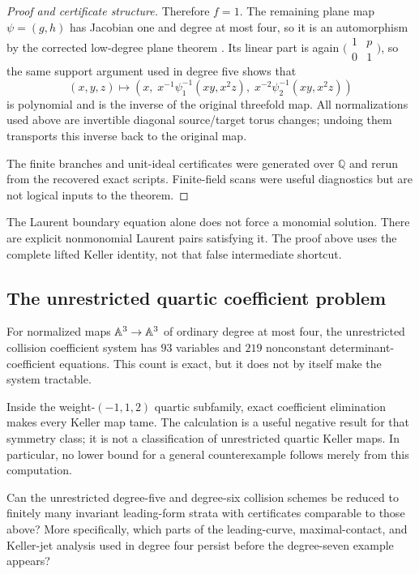 \begin{proof}[Proof and certificate structure]
Therefore \(f=1\).  The remaining plane map \(\psi=(g,h)\) has Jacobian
one and degree at most four, so it is an automorphism by the corrected
low-degree plane theorem \cite{appelgateOnishi1985,nagata1988two}.  Its
linear part is again
\(\bigl(\begin{smallmatrix}1&p\\0&1\end{smallmatrix}\bigr)\), so the same
support argument used in degree five shows that
\[
(x,y,z)\longmapsto
\left(x,\;x^{-1}\psi^{-1}_1(xy,x^2z),\;
x^{-2}\psi^{-1}_2(xy,x^2z)\right)
\]
is polynomial and is the inverse of the original threefold map.  All
normalizations used above are invertible diagonal source/target torus
changes; undoing them transports this inverse back to the original map.

The finite branches and unit-ideal certificates were generated over
\(\mathbb Q\) and rerun from the recovered exact scripts.  Finite-field
scans were useful diagnostics but are not logical inputs to the theorem.
\end{proof}

\begin{remark}
The Laurent boundary equation alone does not force a monomial solution.
There are explicit nonmonomial Laurent pairs satisfying it.  The proof above
uses the complete lifted Keller identity, not that false intermediate
shortcut.
\end{remark}

\subsection{The unrestricted quartic coefficient problem}

For normalized maps \(\mathbb A^3\to\mathbb A^3\) of ordinary degree at most four, the
unrestricted collision coefficient system has \(93\) variables and \(219\)
nonconstant determinant-coefficient equations.  This count is exact, but it
does not by itself make the system tractable.

Inside the weight-\((-1,1,2)\) quartic subfamily, exact coefficient
elimination makes every Keller map tame.  The calculation is a useful
negative result for that symmetry class; it is not a classification of
unrestricted quartic Keller maps.  In particular, no lower bound for a
general counterexample follows merely from this computation.

\begin{question}
\label{q:degree-five-six-bridge}
Can the unrestricted degree-five and degree-six collision schemes be reduced
to finitely many invariant leading-form strata with certificates comparable
to those above?  More specifically, which parts of the leading-curve,
maximal-contact, and Keller-jet analysis used in degree four persist before
the degree-seven example appears?
\end{question}
